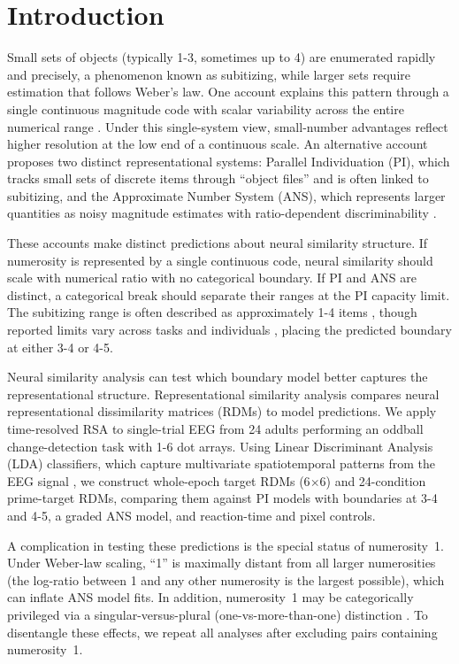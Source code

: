 \section{Introduction}
Small sets of objects (typically 1-3, sometimes up to 4) are enumerated rapidly and precisely, a phenomenon known as subitizing, while larger sets require estimation that follows Weber's law. One account explains this pattern through a single continuous magnitude code with scalar variability across the entire numerical range \citep{GallistelGelman2000}. Under this single-system view, small-number advantages reflect higher resolution at the low end of a continuous scale. An alternative account proposes two distinct representational systems: Parallel Individuation (PI), which tracks small sets of discrete items through ``object files'' and is often linked to subitizing, and the Approximate Number System (ANS), which represents larger quantities as noisy magnitude estimates with ratio-dependent discriminability \citep{FeigensonCarey2003,FeigensonDehaeneSpelke2004}.

These accounts make distinct predictions about neural similarity
structure. If numerosity is represented by a single continuous code, neural
similarity should scale with numerical ratio with no categorical
boundary. If PI and ANS are distinct, a categorical break should
separate their ranges at the PI capacity limit. The subitizing range
is often described as approximately 1-4 items \citep{TrickPylyshyn1994},
though reported limits vary across tasks and individuals
\citep{Cowan2001}, placing the
predicted boundary at either 3-4 or 4-5.

Neural similarity analysis can test which boundary model better captures
the representational structure. Representational similarity analysis
\citep[RSA;][]{Kriegeskorte2008} compares neural representational
dissimilarity matrices (RDMs) to model predictions. We apply
time-resolved RSA to single-trial EEG from 24 adults performing an
oddball change-detection task with 1-6 dot arrays. Using Linear
Discriminant Analysis (LDA) classifiers, which capture multivariate
spatiotemporal patterns from the EEG signal
\citep{KingDehaene2014}, we construct whole-epoch target RDMs
(6$\times$6) and 24-condition prime-target RDMs, comparing them against
PI models with boundaries at 3-4 and 4-5, a graded ANS model, and
reaction-time and pixel controls.

A complication in testing these predictions is the special status of
numerosity~1. Under Weber-law scaling, ``1'' is maximally distant from
all larger numerosities (the log-ratio between 1 and any other
numerosity is the largest possible), which can inflate ANS model fits. In addition,
numerosity~1 may be categorically privileged via a
singular-versus-plural (one-vs-more-than-one) distinction
\citep{Barner2007,Barner2008,Li2009}. To disentangle these effects, we
repeat all analyses after excluding pairs containing numerosity~1.

